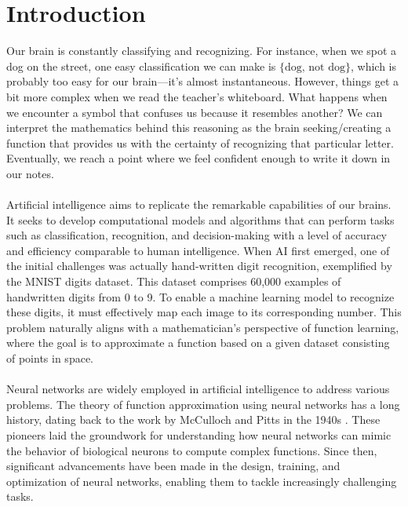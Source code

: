 \documentclass[../main.tex]{subfiles}
\begin{document}
    \chapter{Introduction} \label{ch:intro}
    


\noindent Our brain is constantly classifying and recognizing. For instance, when we spot a dog on the street, one easy classification we can make is  $\{ \text{dog, not dog} \}$, which is probably too easy for our brain—it's almost instantaneous.  However, things get a bit more complex when we read the teacher's whiteboard. What happens when we encounter a symbol that confuses us because it resembles another?
We can interpret the mathematics behind this reasoning as the brain seeking/creating a function that provides us with the certainty of recognizing that particular letter. Eventually, we reach a point where we feel confident enough to write it down in our notes. \\ \\
Artificial intelligence aims to replicate the remarkable capabilities of our brains. It seeks to develop computational models and algorithms that can perform tasks such as classification, recognition, and decision-making with a level of accuracy and efficiency comparable to human intelligence. When AI first emerged, one of the initial challenges was actually hand-written digit recognition, exemplified by the MNIST digits dataset. This dataset comprises 60,000 examples of handwritten digits from 0 to 9. To enable a machine learning model to recognize these digits, it must effectively map each image to its corresponding number.
This problem naturally aligns with a mathematician's perspective of function learning, where the goal is to approximate a function based on a given dataset consisting of points in space.
\\ \\ 
Neural networks are widely employed in artificial intelligence to address various problems. The theory of function approximation using neural networks has a long history, dating back to the work by McCulloch and Pitts in the 1940s \cite{McCulloch1943}. These pioneers laid the groundwork for understanding how neural networks can mimic the behavior of biological neurons to compute complex functions. Since then, significant advancements have been made in the design, training, and optimization of neural networks, enabling them to tackle increasingly challenging tasks.
\end{document}
